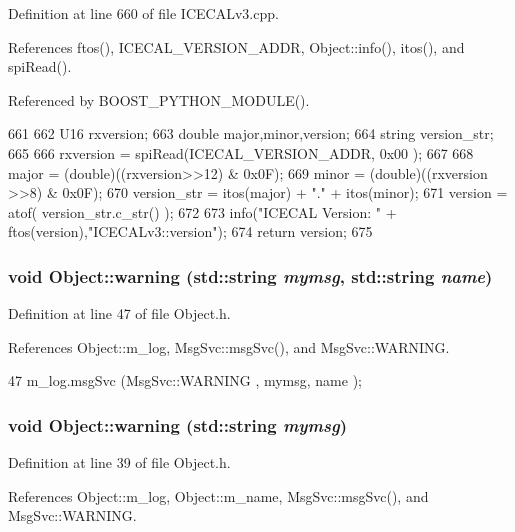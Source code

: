 Definition at line 660 of file ICECALv3.cpp.

References ftos(), ICECAL\_\-VERSION\_\-ADDR, Object::info(), itos(), and spiRead().

Referenced by BOOST\_\-PYTHON\_\-MODULE().


\begin{DoxyCode}
661 {
662     U16 rxversion;
663     double major,minor,version;
664     string version_str;
665 
666     rxversion = spiRead(ICECAL_VERSION_ADDR, 0x00 );
667 
668     major = (double)((rxversion>>12) & 0x0F); 
669     minor = (double)((rxversion >>8) & 0x0F);
670     version_str = itos(major) + "." + itos(minor);
671     version = atof( version_str.c_str() );
672 
673     info("ICECAL Version: " + ftos(version),"ICECALv3::version");
674     return version;
675 }
\end{DoxyCode}
\hypertarget{classObject_a11f101db4dd73d9391b0231818881d86}{
\subsubsection[{warning}]{\setlength{\rightskip}{0pt plus 5cm}void Object::warning (std::string {\em mymsg}, \/  std::string {\em name})}}
\label{classObject_a11f101db4dd73d9391b0231818881d86}


Definition at line 47 of file Object.h.

References Object::m\_\-log, MsgSvc::msgSvc(), and MsgSvc::WARNING.


\begin{DoxyCode}
47 { m_log.msgSvc (MsgSvc::WARNING , mymsg, name ); }
\end{DoxyCode}
\hypertarget{classObject_a65cd4fda577711660821fd2cd5a3b4c9}{
\subsubsection[{warning}]{\setlength{\rightskip}{0pt plus 5cm}void Object::warning (std::string {\em mymsg})}}
\label{classObject_a65cd4fda577711660821fd2cd5a3b4c9}


Definition at line 39 of file Object.h.

References Object::m\_\-log, Object::m\_\-name, MsgSvc::msgSvc(), and MsgSvc::WARNING.


